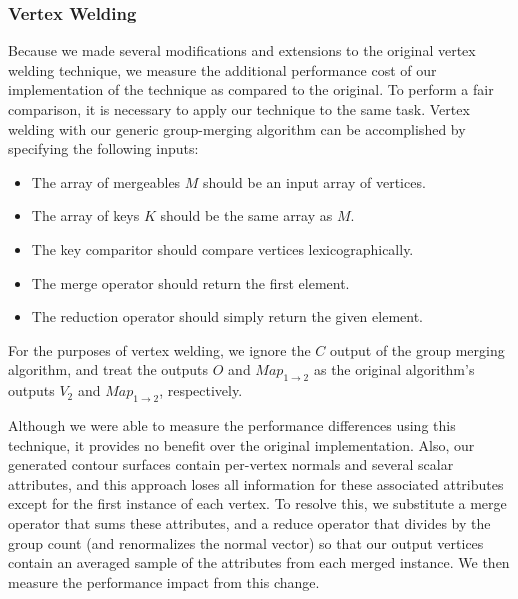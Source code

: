 \documentclass[journal]{vgtc}                %
\begin{document}
\subsubsection{Vertex Welding}

Because we made several modifications and extensions to the original vertex welding technique, we measure the additional performance
cost of our implementation of the technique as compared to the original. To perform a fair comparison, it is necessary to apply our technique to the same task. Vertex welding with
our generic group-merging algorithm can be accomplished by specifying the following inputs:

\begin{itemize}
\item{The array of mergeables $M$ should be an input array of vertices.}
\item{The array of keys $K$ should be the same array as $M$.}
\item{The key comparitor should compare vertices lexicographically.}
\item{The merge operator should return the first element.}
\item{The reduction operator should simply return the given element.}
\end{itemize}

For the purposes of vertex welding, we ignore the $C$ output of the group merging algorithm, and treat the outputs $O$ and $Map_{1\rightarrow 2}$ as the original algorithm's outputs $V_2$ and $Map_{1\rightarrow 2}$, respectively.

Although we were able to measure the performance differences using this technique, it provides no benefit over the original implementation. Also, our generated contour surfaces contain per-vertex normals and several scalar attributes, and this approach loses all information for these associated attributes except for the first instance of each vertex. To resolve this, we substitute a merge operator that sums these attributes, and a reduce operator that divides by the group count (and renormalizes the normal vector) so that our output vertices contain an averaged sample of the attributes from each merged instance. We then measure the performance impact from this change.
\end{document}
